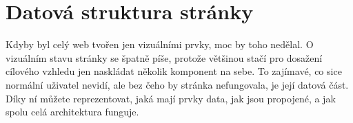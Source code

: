 \section{Datová struktura stránky}

Kdyby byl celý web tvořen jen vizuálními prvky, moc by toho nedělal. O vizuálním stavu stránky se špatně píše, protože většinou stačí pro dosažení cílového vzhledu jen naskládat několik komponent na sebe. To zajímavé, co sice normální uživatel nevidí, ale bez čeho by stránka nefungovala, je její datová část. Díky ní můžete reprezentovat, jaká mají prvky data, jak jsou propojené, a jak spolu celá architektura funguje.


\newpage

\newpage

\newpage

\newpage